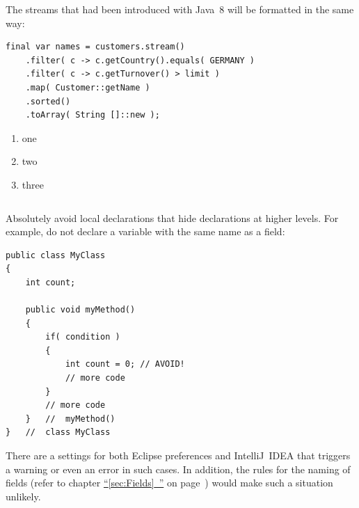 \documentclass[11pt,a4paper, titlepage, parskip=half, headsepline, footsepline, cleardoublepage=current, headheight=1cm]{scrbook}
\newcommand*{\tqfullvref}[1]{\hyperref[{#1}]{“\ref*{#1}~\nameref*{#1}”} on page~\pageref{#1}}
\begin{document}
The streams that had been introduced with Java~8 will be formatted in the same way:
\begin{lstlisting}
final var names = customers.stream()
    .filter( c -> c.getCountry().equals( GERMANY )
    .filter( c -> c.getTurnover() > limit )
    .map( Customer::getName )
    .sorted()
    .toArray( String []::new );
\end{lstlisting}


\hrulefill\newpage 

\begin{enumerate}[label=P\arabic*.]
\item one
\item two
\item three
\end{enumerate}

\begin{lstlisting}[numbers=left]
\end{lstlisting}



Absolutely avoid local declarations that hide declarations at higher levels. For example, do not declare a variable with the same name as a field:
\begin{lstlisting}
public class MyClass
{
    int count;

    public void myMethod()
    {
        if( condition )
        {
            int count = 0; // AVOID!
            // more code
        }
        // more code
    }   //  myMethod()
}   //  class MyClass
\end{lstlisting}
There are a settings for both Eclipse preferences and IntelliJ~IDEA that triggers a warning or even an error in such cases. In addition, the rules for the naming of fields (refer to chapter \tqfullvref{sec:Fields}) would make such a situation unlikely.
\end{document}
